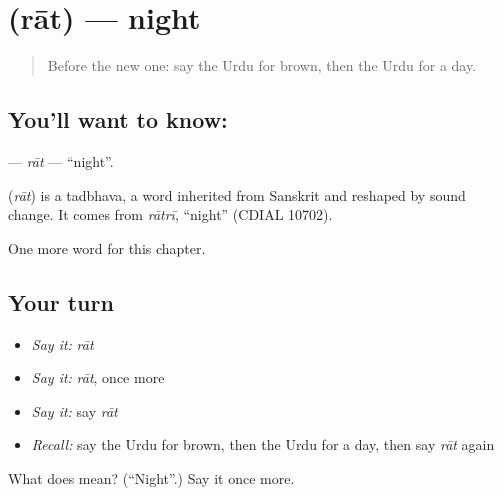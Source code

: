 \section[\texorpdfstring{\ur{رات} (rāt)}{رات (rāt)}]{ (rāt) — night}

\label{lesson:UR-C74-rat}



\begin{quote}
Before the new one: say the Urdu for brown, then the Urdu for a day.
\end{quote}

\subsection*{You'll want to know: }
\textbf{} — \emph{rāt} — \textquotedblleft{}night\textquotedblright{}.

\begin{cousinweb}
\textbf{} (\emph{rāt}) is a tadbhava, a word inherited from Sanskrit and reshaped by sound change. It comes from \emph{rātrī}, \textquotedblleft{}night\textquotedblright{} (CDIAL 10702).
\end{cousinweb}

\begin{grammarlens}[title={What you've built}]
One more word for this chapter.
\end{grammarlens}

\subsection*{Your turn}
\begin{itemize}
\raggedright
  \item \emph{Say it:} \emph{rāt}
  \item \emph{Say it:} \emph{rāt}, once more
  \item \emph{Say it:} say \emph{rāt}
  \item \emph{Recall:} say the Urdu for brown, then the Urdu for a day, then say \emph{rāt} again
\end{itemize}

\begin{tcolorbox}[breakable,colback=teal!4,colframe=teal!35!black,title={Before you move on}]
What does  mean? (\textquotedblleft{}Night\textquotedblright{}.) Say it once more.
\end{tcolorbox}

